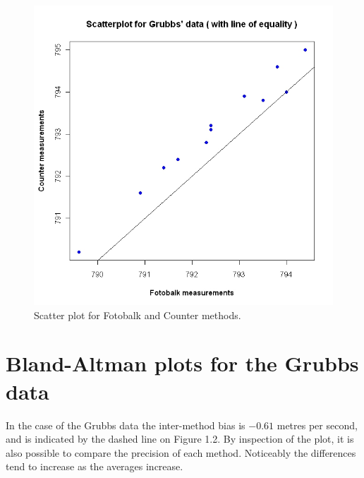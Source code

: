 \documentclass[12pt, a4paper]{report}
\theoremstyle{plain}
\theoremstyle{definition}
\theoremstyle{remark}
\begin{document}
	\begin{figure}[h!]
		\begin{center}
			\includegraphics[width=125mm]{images/GrubbsScatter.jpeg}
			\caption{Scatter plot for Fotobalk and Counter methods.}\label{GrubbsScatter}
		\end{center}
	\end{figure}

%
%	
	\section{Bland-Altman plots for the Grubbs data}
	
	In the case of the Grubbs data the inter-method bias is $-0.61$ metres per second, and is indicated by the dashed line on Figure 1.2. By inspection of the plot, it is also possible to compare the precision of each method. Noticeably the differences tend to increase as the averages increase.
	
\end{document}

